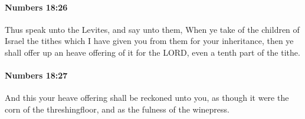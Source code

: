		\paragraph{Numbers 18:26} %
			\label{NUMBERS-18-26}

			Thus speak unto the Levites, and say unto them, When ye take of the children of Israel the tithes which I have given you from them for your inheritance, then ye shall offer up an heave offering of it for the LORD, even a tenth part of the tithe.


		\paragraph{Numbers 18:27} %
			\label{NUMBERS-18-27}

			And this your heave offering shall be reckoned unto you, as though it were the corn of the threshingfloor, and as the fulness of the winepress.

